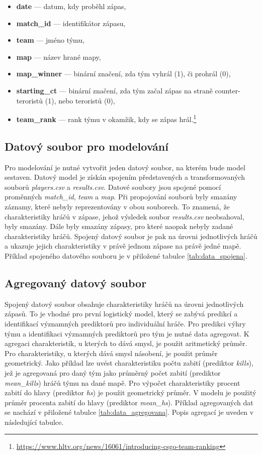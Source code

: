\begin{itemize}
    \item \textbf{date} --- datum, kdy proběhl zápas,
    \item \textbf{match\_id} --- identifikátor zápasu,
    \item \textbf{team} --- jméno týmu,
    \item \textbf{map} --- název hrané mapy,
    \item \textbf{map\_winner} --- binární značení, zda tým vyhrál (1), či prohrál (0),
    \item \textbf{starting\_ct} --- binární značení, zda tým začal zápas na straně counter-teroristů (1), nebo teroristů (0),
    \item \textbf{team\_rank} --- rank týmu v okamžik, kdy se zápas hrál.\footnote{\url{https://www.hltv.org/news/16061/introducing-csgo-team-ranking}}
\end{itemize}

\subsection{Datový soubor pro modelování} \label{sec:spojeny_datovy_soubor}
Pro modelování je nutné vytvořit jeden datový soubor, na kterém bude model sestaven. Datový model je získán spojením představených a transformovaných souborů
\textit{players.csv} a \textit{results.csv}. Datové soubory jsou spojené pomocí proměnných \textit{match\_id}, \textit{team} a \textit{map}. Při propojování
souborů byly smazány záznamy, které nebyly reprezentovány v obou souborech. To znamená, že charakteristiky hráčů v zápase, jehož výsledek soubor  \textit{results.csv} neobsahoval,
byly smazány. Dále byly smazány zápasy, pro které naopak nebyly zadané charakteristiky hráčů. Spojený datový soubor je pak na úrovni jednotlivých hráčů a ukazuje jejich
charakteristiky v právě jednom zápase na právě jedné mapě. Příklad spojeného datového souboru je v přiložené tabulce \ref{tab:data_spojena}.

\subsection{Agregovaný datový soubor} \label{sec:agregovany_datovy_soubor}
Spojený datový soubor obsahuje charakteristiky hráčů na úrovni jednotlivých zápasů. To je vhodné pro první logistický model, který se zabývá predikcí a identifikací
významných prediktorů pro individuální hráče. Pro predikci výhry týmu a identifikaci významných prediktorů pro tým je nutné data agregovat. K agregaci charakteristik, u kterých
to dává smysl, je použit aritmetický průměr. Pro charakteristiky, u kterých dává smysl násobení, je použit průměr geometrický. Jako příklad lze uvést charakteristiku 
počtu zabití (prediktor \textit{kills}), jež je agregovaná pro daný tým jako průměrný počet zabití (prediktor \textit{mean\_kills}) hráčů týmu na dané mapě. Pro výpočet
charakteristiky procent zabití do hlavy (prediktor \textit{hs}) je použit geometrický průměr. V modelu je použitý průměr procenta zabití do hlavy (prediktor \textit{mean\_hs}).
Příklad agregovaných dat se nachází v přiložené tabulce \ref{tab:data_agregovana}. Popis agregací je uveden v následující tabulce.

